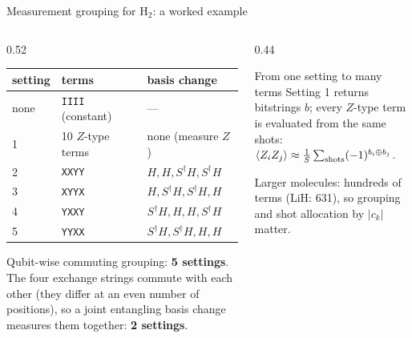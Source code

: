 \documentclass[aspectratio=169,11pt]{beamer}
\newcommand{\key}[1]{{\color{qdark}\textbf{#1}}}
\begin{document}
\begin{frame}{Measurement grouping for H$_2$: a worked example}
  \begin{columns}[T]
    \begin{column}{0.52\textwidth}
      \small
      \begin{center}
      \begin{tabular}{lll}
        \toprule setting & terms & basis change\\ \midrule
        none & \texttt{IIII} (constant) & ---\\
        1 & 10 $Z$-type terms & none (measure $Z$)\\
        2 & \texttt{XXYY} & $H, H, S^\dagger H, S^\dagger H$\\
        3 & \texttt{XYYX} & $H, S^\dagger H, S^\dagger H, H$\\
        4 & \texttt{YXXY} & $S^\dagger H, H, H, S^\dagger H$\\
        5 & \texttt{YYXX} & $S^\dagger H, S^\dagger H, H, H$\\ \bottomrule
      \end{tabular}
      \end{center}
      Qubit-wise commuting grouping: \key{5 settings}. The four exchange strings commute with each other (they differ at an even number of positions), so a joint
      entangling basis change measures them together: \key{2 settings}.
    \end{column}
    \begin{column}{0.44\textwidth}
      \begin{block}{From one setting to many terms}
        Setting 1 returns bitstrings $b$; every $Z$-type term is evaluated from the same shots:
        $\braket{Z_iZ_j} \approx \frac1S\sum_{\text{shots}}(-1)^{b_i\oplus b_j}$.
      \end{block}
      \small Larger molecules: hundreds of terms (LiH: 631), so grouping and shot allocation by $|c_k|$ matter.
    \end{column}
  \end{columns}
\end{frame}
\end{document}
